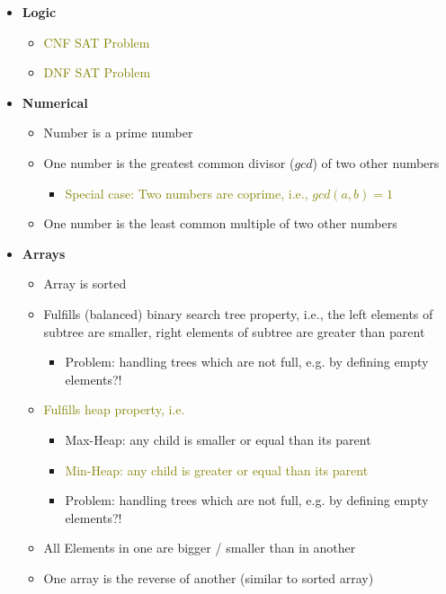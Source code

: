\documentclass{article}
\newcommand{\narrow}{\setlength\itemsep{0pt}}
\begin{document}
\begin{itemize}\narrow
    \item \textbf{Logic}
    \begin{itemize}
        \item \textcolor{olive}{CNF SAT Problem}
        \item \textcolor{olive}{DNF SAT Problem}
    \end{itemize}
    \item \textbf{Numerical}
    \begin{itemize}
        \item Number is a prime number
        \item One number is the greatest common divisor ($gcd$) of two other numbers
        \begin{itemize}
            \item \textcolor{olive}{Special case: Two numbers are coprime, i.e., $gcd(a,b) = 1$}
        \end{itemize}
        \item One number is the least common multiple of two other numbers
    \end{itemize}
\item \textbf{Arrays}
    \begin{itemize}
        \item Array is sorted
        \item Fulfills (balanced) binary search tree property, i.e., the left elements of subtree are smaller, right elements of subtree are greater than parent
        \begin{itemize}
            \item Problem: handling trees which are not full, e.g. by defining empty elements?!
        \end{itemize}
        \item \textcolor{olive}{Fulfills heap property, i.e.}
        \begin{itemize}
            \item Max-Heap: any child is smaller or equal than its parent
            \item \textcolor{olive}{Min-Heap: any child is greater or equal than its parent}
            \item Problem: handling trees which are not full, e.g. by defining empty elements?!
        \end{itemize}
        \item All Elements in one are bigger / smaller than in another
        \item One array is the reverse of another (similar to sorted array)

\end{itemize}
\end{itemize}
\end{document}
